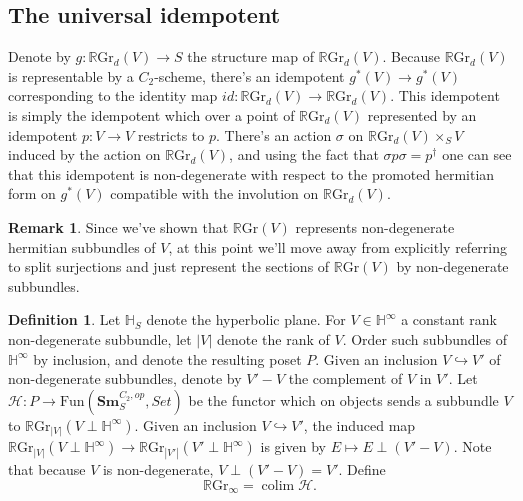 \documentclass[draftthesis,tocnosub,noragright,centerchapter,10pt]{uiucthesis2009}
\newcommand{\mbb}{\mathbb}
\newcommand{\mc}{\mathcal}
\newcommand{\RGr}{\mathbb R\mathrm{Gr}}
\newcommand{\Sm}[1]{\mathbf{Sm}_{#1}}
\DeclareMathOperator*{\colim}{colim}
\theoremstyle{plain}
\theoremstyle{definition}
\newtheorem{definition}[lemma]{Definition}
\newtheorem{remark}[lemma]{Remark}
\begin{document}
\subsection{The universal idempotent}

Denote by $g : \RGr_d(V) \rightarrow S$ the structure map of
$\RGr_d(V)$.  Because $\RGr_d(V)$ is representable by a $C_2$-scheme, there's an
idempotent $g^*(V) \rightarrow g^*(V)$ corresponding to the identity map $id: \RGr_d(V) \rightarrow
\RGr_d(V)$. This idempotent is simply the idempotent which over a
point of $\RGr_d(V)$ represented by an idempotent $p : V \rightarrow
V$ restricts to $p$. There's an action $\sigma$ on $\RGr_d(V) \times_S V$
induced by the action on $\RGr_d(V)$, and using the fact that $\sigma
p \sigma = p^\dagger$ one can see that this idempotent is
non-degenerate with respect to the promoted hermitian form on $g^*(V)$
compatible with the involution on $\RGr_d(V)$.

\begin{remark}
Since we've shown that $\RGr(V)$ represents non-degenerate hermitian
subbundles of $V$, at this point we'll move away from explicitly
referring to split surjections and just represent the sections of
$\RGr(V)$ by non-degenerate subbundles. 
\end{remark}

\begin{definition}
Let $\mbb H_S$ denote the hyperbolic plane. For $V \in \mbb H^\infty$
a constant rank non-degenerate subbundle,
let $|V|$ denote the rank of $V$. Order such subbundles of $\mbb
H^\infty$ by inclusion, and denote the resulting poset $P$. Given an inclusion $V \hookrightarrow V'$
of non-degenerate subbundles, denote by $V'-V$ the complement of $V$
in $V'$. Let $\mc H : P \rightarrow \mathrm{Fun}(\Sm{S}^{C_2,
  op},Set)$ be the functor which on objects sends a subbundle $V$ to $
\RGr_{|V|} (V \perp \mbb H^\infty)$. Given an inclusion $V \hookrightarrow V'$, the induced map
$\RGr_{|V|}(V \perp \mbb H^\infty) \rightarrow \RGr_{|V'|}(V' \perp
\mbb H^\infty)$ is given by $E \mapsto E \perp (V'-V)$. Note that
because $V$ is non-degenerate, $V \perp (V'-V) = V'$. Define
\[
\RGr_\infty = \colim \mc H.
\]

\end{definition}



\end{document}
